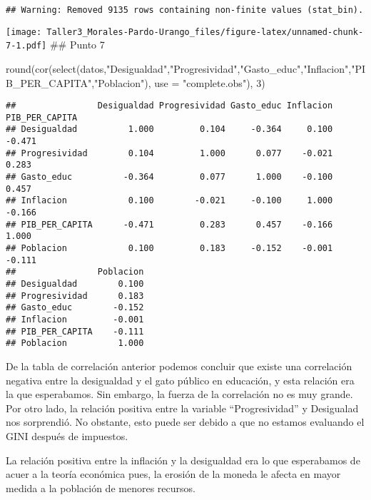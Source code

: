 \documentclass[
]{article}
\newenvironment{Shaded}{\begin{snugshade}}{\end{snugshade}}
\newcommand{\AttributeTok}[1]{\textcolor[rgb]{0.77,0.63,0.00}{#1}}
\newcommand{\DecValTok}[1]{\textcolor[rgb]{0.00,0.00,0.81}{#1}}
\newcommand{\FunctionTok}[1]{\textcolor[rgb]{0.00,0.00,0.00}{#1}}
\newcommand{\NormalTok}[1]{#1}
\newcommand{\StringTok}[1]{\textcolor[rgb]{0.31,0.60,0.02}{#1}}
\begin{document}
\begin{verbatim}
## Warning: Removed 9135 rows containing non-finite values (stat_bin).
\end{verbatim}

\texttt{[image: Taller3\_Morales-Pardo-Urango\_files/figure-latex/unnamed-chunk-7-1.pdf]}
\#\# Punto 7

\begin{Shaded}
\begin{Highlighting}[]
\FunctionTok{round}\NormalTok{(}\FunctionTok{cor}\NormalTok{(}\FunctionTok{select}\NormalTok{(datos,}\StringTok{"Desigualdad"}\NormalTok{,}\StringTok{"Progresividad"}\NormalTok{,}\StringTok{"Gasto\_educ"}\NormalTok{,}\StringTok{"Inflacion"}\NormalTok{,}\StringTok{"PIB\_PER\_CAPITA"}\NormalTok{,}\StringTok{"Poblacion"}\NormalTok{), }\AttributeTok{use =} \StringTok{"complete.obs"}\NormalTok{), }\DecValTok{3}\NormalTok{)}
\end{Highlighting}
\end{Shaded}

\begin{verbatim}
##                Desigualdad Progresividad Gasto_educ Inflacion PIB_PER_CAPITA
## Desigualdad          1.000         0.104     -0.364     0.100         -0.471
## Progresividad        0.104         1.000      0.077    -0.021          0.283
## Gasto_educ          -0.364         0.077      1.000    -0.100          0.457
## Inflacion            0.100        -0.021     -0.100     1.000         -0.166
## PIB_PER_CAPITA      -0.471         0.283      0.457    -0.166          1.000
## Poblacion            0.100         0.183     -0.152    -0.001         -0.111
##                Poblacion
## Desigualdad        0.100
## Progresividad      0.183
## Gasto_educ        -0.152
## Inflacion         -0.001
## PIB_PER_CAPITA    -0.111
## Poblacion          1.000
\end{verbatim}

De la tabla de correlación anterior podemos concluir que existe una
correlación negativa entre la desigualdad y el gato público en
educación, y esta relación era la que esperabamos. Sin embargo, la
fuerza de la correlación no es muy grande. Por otro lado, la relación
positiva entre la variable ``Progresividad'' y Desigualad nos
sorprendió. No obstante, esto puede ser debido a que no estamos
evaluando el GINI después de impuestos.

La relación positiva entre la inflación y la desigualdad era lo que
esperabamos de acuer a la teoría económica pues, la erosión de la moneda
le afecta en mayor medida a la población de menores recursos.
\end{document}
